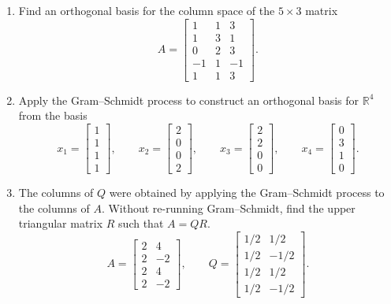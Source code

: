 \documentclass[11pt, letterpaper]{article}
\theoremstyle{definition}
\theoremstyle{remark}
\begin{document}
\begin{enumerate}[label=\textbf{Problem \arabic*.}, leftmargin=*, itemsep=0.9em]
    \item Find an orthogonal basis for the column space of the $5 \times 3$ matrix
    \[
        A = \begin{bmatrix}
            1 & 1 & 3 \\
            1 & 3 & 1 \\
            0 & 2 & 3 \\
            -1 & 1 & -1 \\
            1 & 1 & 3
        \end{bmatrix}.
    \]

    \item Apply the Gram--Schmidt process to construct an orthogonal basis for $\mathbb{R}^4$ from the basis
    \[
        x_1 = \begin{bmatrix} 1 \\ 1 \\ 1 \\ 1 \end{bmatrix}, \qquad
        x_2 = \begin{bmatrix} 2 \\ 0 \\ 0 \\ 2 \end{bmatrix}, \qquad
        x_3 = \begin{bmatrix} 2 \\ 2 \\ 0 \\ 0 \end{bmatrix}, \qquad
        x_4 = \begin{bmatrix} 0 \\ 3 \\ 1 \\ 0 \end{bmatrix}.
    \]

    \item The columns of $Q$ were obtained by applying the Gram--Schmidt process to the columns of $A$. Without re-running Gram--Schmidt, find the upper triangular matrix $R$ such that $A = QR$.
    \[
        A = \begin{bmatrix}
            2 & 4 \\
            2 & -2 \\
            2 & 4 \\
            2 & -2
        \end{bmatrix}, \qquad
        Q = \begin{bmatrix}
            1/2 & 1/2 \\
            1/2 & -1/2 \\
            1/2 & 1/2 \\
            1/2 & -1/2
        \end{bmatrix}.
    \]


\end{enumerate}
\end{document}
